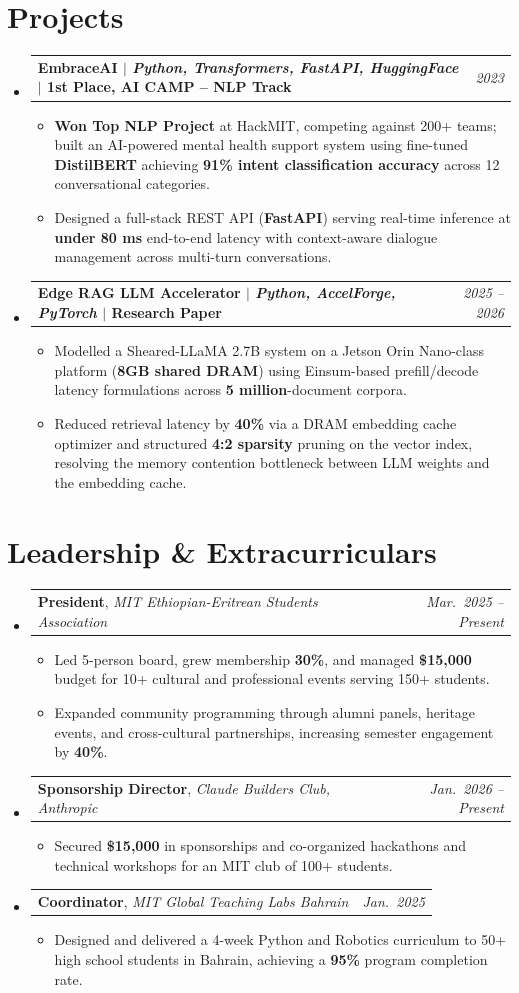 \documentclass[letterpaper,10pt]{article}
\makeatletter
\newcommand{\resumeItem}[1]{
  \item\small{
    {#1 \vspace{-2pt}}
  }
}
\newcommand{\resumeProjectHeading}[2]{
    \item
    \begin{tabular*}{0.97\textwidth}{l@{\extracolsep{\fill}}r}
      \small\textbf{#1} & \textit{\small #2} \\
    \end{tabular*}\vspace{-7pt}
}
\newcommand{\resumeLeadershipHeading}[3]{
    \item
    \begin{tabular*}{0.97\textwidth}[t]{l@{\extracolsep{\fill}}r}
      \small\textbf{#1}, \textit{#2} & \textit{\small #3} \\
    \end{tabular*}\vspace{-7pt}
}
\newcommand{\resumeSubHeadingListStart}{\begin{itemize}[leftmargin=0.15in, label={}]}
\newcommand{\resumeSubHeadingListEnd}{\end{itemize}}
\newcommand{\resumeItemListStart}{\begin{itemize}}
\newcommand{\resumeItemListEnd}{\end{itemize}\vspace{-5pt}}
\makeatother
\begin{document}
\section{Projects}
\vspace{3pt}
\resumeSubHeadingListStart

  \resumeProjectHeading
    {\textbf{EmbraceAI} $|$ \emph{Python, Transformers, FastAPI, HuggingFace} $|$ \textbf{1st Place, AI CAMP -- NLP Track}}{2023}
    \resumeItemListStart
      \resumeItem{\textbf{Won Top NLP Project} at HackMIT, competing against 200+ teams; built an AI-powered mental health support system using fine-tuned \textbf{DistilBERT} achieving \textbf{91\% intent classification accuracy} across 12 conversational categories.}
      \resumeItem{Designed a full-stack REST API (\textbf{FastAPI}) serving real-time inference at \textbf{under 80 ms} end-to-end latency with context-aware dialogue management across multi-turn conversations.}
    \resumeItemListEnd

  \resumeProjectHeading
    {\textbf{Edge RAG LLM Accelerator} $|$ \emph{Python, AccelForge, PyTorch} $|$ \textbf{Research Paper}}{2025 -- 2026}
    \resumeItemListStart
      \resumeItem{Modelled a Sheared-LLaMA 2.7B system on a Jetson Orin Nano-class platform (\textbf{8GB shared DRAM}) using Einsum-based prefill/decode latency formulations across \textbf{5 million}-document corpora.}
      \resumeItem{Reduced retrieval latency by \textbf{40\%} via a DRAM embedding cache optimizer and structured \textbf{4:2 sparsity} pruning on the vector index, resolving the memory contention bottleneck between LLM weights and the embedding cache.}
    \resumeItemListEnd

\resumeSubHeadingListEnd

\section{Leadership \& Extracurriculars}
    \resumeSubHeadingListStart
        \resumeLeadershipHeading{President}{MIT Ethiopian-Eritrean Students Association}{Mar.\ 2025 -- Present}
            \resumeItemListStart
                \resumeItem{Led 5-person board, grew membership \textbf{30\%}, and managed \textbf{\$15,000} budget for 10+ cultural and professional events serving 150+ students.}
                \resumeItem{Expanded community programming through alumni panels, heritage events, and cross-cultural partnerships, increasing semester engagement by \textbf{40\%}.}
            \resumeItemListEnd
        \resumeLeadershipHeading{Sponsorship Director}{Claude Builders Club, Anthropic}{Jan.\ 2026 -- Present}
            \resumeItemListStart
                \resumeItem{Secured \textbf{\$15,000} in sponsorships and co-organized hackathons and technical workshops for an MIT club of 100+ students.}
            \resumeItemListEnd
        \resumeLeadershipHeading{Coordinator}{MIT Global Teaching Labs Bahrain}{Jan.\ 2025}
            \resumeItemListStart
                \resumeItem{Designed and delivered a 4-week Python and Robotics curriculum to 50+ high school students in Bahrain, achieving a \textbf{95\%} program completion rate.}
            \resumeItemListEnd
    \resumeSubHeadingListEnd
\end{document}
